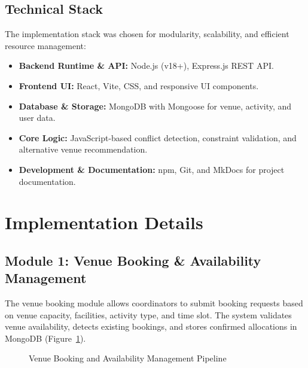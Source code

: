 \documentclass[12pt, a4paper, oneside]{report}
\begin{document}
\subsection{Technical Stack}
The implementation stack was chosen for modularity, scalability, and efficient resource management:
\begin{itemize}
    \item \textbf{Backend Runtime \& API:} Node.js (v18+), Express.js REST API.
    \item \textbf{Frontend UI:} React, Vite, CSS, and responsive UI components.
    \item \textbf{Database \& Storage:} MongoDB with Mongoose for venue, activity, and user data.
    \item \textbf{Core Logic:} JavaScript-based conflict detection, constraint validation, and alternative venue recommendation.
    \item \textbf{Development \& Documentation:} npm, Git, and MkDocs for project documentation.
\end{itemize}
\section{Implementation Details}
\subsection{Module 1: Venue Booking \& Availability Management}

The venue booking module allows coordinators to submit booking requests based on venue capacity, facilities, activity type, and time slot. The system validates venue availability, detects existing bookings, and stores confirmed allocations in MongoDB (Figure~\ref{fig:booking_flow}).

\begin{figure}[H]
\centering
{}
\caption{Venue Booking and Availability Management Pipeline}
\label{fig:booking_flow}
\end{figure}
\end{document}
